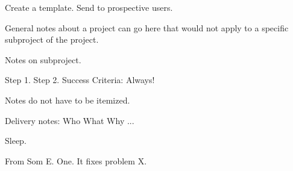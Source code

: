 

  \todotoday  %
  \stit  %
    \itm Create a template.
    \itm Send to prospective users.
    \itm  %
  \enit  %

    General notes about a project can go here that would not apply to a specific subproject of the project.

    \stit
      \itm Notes on subproject.
      \itm 
    \enit

    \sten  %
      \itm Step 1.
      \itm Step 2.
      \itm Success Criteria: Always!
    \enen

      Notes do not have to be itemized.
  
      Delivery notes:
      \stit
        \itm Who
        \itm What
        \itm Why
        \itm ...
      \enit

  \todotoday
  \stit
    \itm Sleep.
  \enit

      From Som E. One. It fixes problem X.

